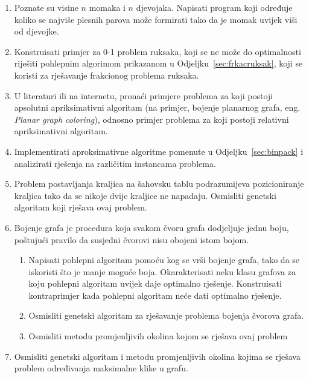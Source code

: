 \documentclass[a4paper, utf8, 11pt, colorlinks]{book}
\theoremstyle{definition}
\begin{document}
\begin{enumerate}
	\item Poznate su visine $n$ momaka i $n$ djevojaka. Napisati program koji
	određuje koliko se najviše plesnih parova može formirati tako da je momak uvijek
	viši od djevojke.
	\item Konstruisati primjer za 0-1 problem ruksaka, koji se ne može do optimalnosti riješiti pohlepnim algorimom prikazanom u Odjeljku~\ref{sec:frkacruksak}, koji se koristi za rješavanje frakcionog problema ruksaka.
	
	\item   U literaturi ili na internetu, pronaći primjere problema za koji postoji apsolutni apriksimativni algoritam (na primjer, bojenje planarnog grafa, eng. \emph{Planar graph coloring}), odnosno primjer problema za koji postoji relativni apriksimativni algoritam.
	
	\item Implementirati aproksimativne algoritme pomenute u Odjeljku~\ref{sec:binpack} i analizirati rješenja na različitim instancama problema.
	\item Problem postavljanja kraljica na šahovsku tablu podrazumijeva pozicioniranje kraljica tako da se nikoje dvije kraljice ne napadaju. Osmisliti genetski algoritam koji rješava ovaj problem.
		\item Bojenje grafa je procedura koja svakom čvoru grafa dodjeljuje jednu boju, poštujući pravilo da susjedni čvorovi nisu obojeni istom bojom. 
		\begin{enumerate}
			\item 	Napisati pohlepni algoritam pomoću kog se vrši bojenje grafa, tako da se iskoristi što je manje moguće boja.  Okarakterisati neku klasu grafova za koju  pohlepni algoritam uvijek daje optimalno rješenje. Konstruisati kontraprimjer kada pohlepni algoritam neće dati optimalno rješenje.
	\item Osmisliti genetski algoritam za rješavanje problema bojenja čvorova grafa.
	\item Osmisliti metodu promjenljivih okolina kojom se rješava ovaj problem
		\end{enumerate}
	
	\item Osmisliti genetski algoritam i metodu promjenljivih okolina kojima se rješava problem određivanja maksimalne klike u grafu.
	

\end{enumerate}
\end{document}
